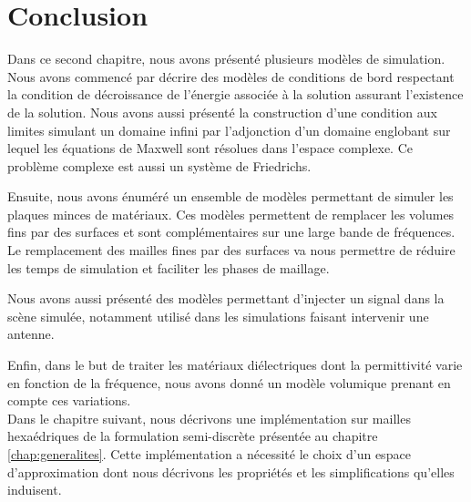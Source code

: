 \section*{Conclusion}


Dans ce second chapitre, nous avons présenté plusieurs modèles de simulation.
Nous avons commencé par décrire des modèles de conditions de bord respectant la
condition de décroissance de l'énergie associée à la solution
assurant l'existence de la solution.
Nous avons aussi présenté la construction d'une condition aux limites
simulant un domaine infini par l'adjonction d'un domaine englobant
sur lequel les équations de Maxwell sont résolues dans l'espace complexe.
Ce problème complexe est aussi un système de Friedrichs.

Ensuite, nous avons énuméré un ensemble de modèles permettant de simuler
les plaques minces de matériaux. Ces modèles permettent de remplacer
les volumes fins par des surfaces et sont complémentaires sur une
large bande de fréquences.
Le remplacement des mailles fines par des surfaces va nous permettre
de réduire les temps de simulation et faciliter les phases de maillage.

Nous avons aussi présenté des modèles permettant d'injecter
un signal dans la scène simulée, notamment utilisé dans les
simulations faisant intervenir une antenne.

Enfin, dans le but de traiter les matériaux diélectriques dont la permittivité
varie en fonction de la fréquence, nous avons donné un modèle volumique prenant
en compte ces variations.
\\

Dans le chapitre suivant,
nous décrivons une implémentation sur mailles hexaédriques 
de la formulation semi-discrète présentée au chapitre \ref{chap:generalites}.
Cette implémentation a nécessité le choix d'un espace d'approximation
dont nous décrivons les propriétés et les simplifications qu'elles induisent.



















